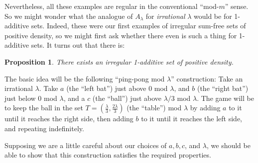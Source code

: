 \documentclass{report}
\newtheorem{proposition}[theorem]{Proposition}
\theoremstyle{remark}
\numberwithin{equation}{section}
\begin{document}
Nevertheless, all these examples are regular in the conventional
``mod-$m$'' sense.  So we might wonder what the analogue of
$A_\lambda$ for {\em irrational} $\lambda$ would be for 1-additive sets.
Indeed, these were our first examples of irregular sum-free sets of
positive density, so we might first ask whether there even is such a
thing for 1-additive sets.  It turns out that there is:

\begin{proposition}\label{prop:irr_1add}
  There exists an irregular 1-additive set of positive density.
\end{proposition}

The basic idea will be the following ``ping-pong mod $\lambda$''
construction: Take an irrational $\lambda$.  Take $a$ (the ``left
bat'') just above $0$ mod $\lambda$, and $b$ (the ``right bat'') just
below 0 mod $\lambda$, and a $c$ (the ``ball'') just above $\lambda/3$
mod $\lambda$.  The game will be to keep the ball in the set
$T = (\frac{\lambda}{3}, \frac{2\lambda}{3})$ (the ``table'') mod
$\lambda$ by adding $a$ to it until it reaches the right side, then
adding $b$ to it until it reaches the left side, and repeating
indefinitely.

Supposing we are a little careful about our choices of $a, b, c$, and
$\lambda$, we should be able to show that this construction satisfies
the required properties.
\end{document}
